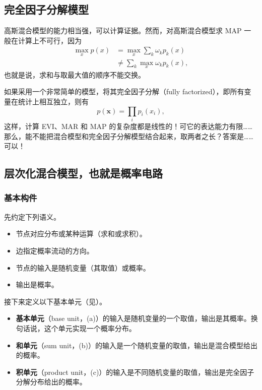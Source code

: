 \subsection{完全因子分解模型}
高斯混合模型的能力相当强，可以计算证据。然而，对高斯混合模型求 MAP 一般在计算上不可行，因为
\begin{align}
\max_x p(x)&=\max_x\sum_k\omega_k p_k(x)
       \tag{2.39}\label{eq:02-39}\\
 &\ne\sum_k\max_x\omega_k p_k(x),
       \tag{2.40}\label{eq:02-40}
\end{align}
也就是说，求和与取最大值的顺序不能交换。

如果采用一个非常简单的模型，将其完全因子分解（fully factorized），即所有变量在统计上相互独立，则有
\begin{equation}
p(\mathbf{x})=\prod_i p_i(x_i),
\tag{2.41}\label{eq:02-41}
\end{equation}
这样，计算 EVI、MAR 和 MAP 的复杂度都是线性的！可它的表达能力有限……那么，能不能把混合模型和完全因子分解模型结合起来，取两者之长？答案是……可以！

\subsection{层次化混合模型，也就是概率电路}
\subsubsection{基本构件}
先约定下列语义。
\begin{itemize}
\item 节点对应分布或某种运算（求和或求积）。
\item 边指定概率流动的方向。
\item 节点的输入是随机变量（其取值）或概率。
\item 输出是概率。
\end{itemize}

接下来定义以下基本单元（见）。
\begin{itemize}
\item \textbf{基本单元}（base unit，(a)）的输入是随机变量的一个取值，输出是其概率。换句话说，这个单元实现一个概率分布。
\item \textbf{和单元}（sum unit，(b)）的输入是一个随机变量的取值，输出是混合模型给出的概率。
\item \textbf{积单元}（product unit，(c)）的输入是不同随机变量的取值，输出是完全因子分解分布给出的概率。
\end{itemize}

